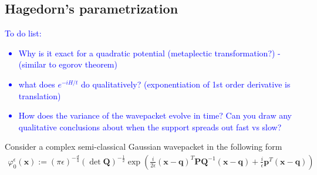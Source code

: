 \usepackage{amsmath}
\usepackage{amssymb}
\newtheorem{theorem}{Theorem}[section]
\newtheorem{lemma}[theorem]{Lemma}
\theoremstyle{definition}
\let\proof\relax\let\endproof\relax %
\usepackage{amsthm,xpatch}
\xpatchcmd{\proof}{\itshape}{\bfseries}{}{}
\renewcommand\qedsymbol{$\blacksquare$}
\usepackage{comment}
\usepackage[
backend=biber,
style=alphabetic,
sorting=ynt
]{biblatex}




\subsection{Hagedorn's parametrization}
\textcolor{blue}{To do list:
\begin{itemize}
  \item Why is it exact for a quadratic potential (metaplectic transformation?) - (similar to egorov theorem)  
  \item what does $e^{-iH/t}$ do qualitatively? (exponentiation of 1st order derivative is translation)
  \item How does the variance of the wavepacket evolve in time? Can you draw 
    any qualitative conclusions about when the support spreads out fast vs slow?
\end{itemize}
}
Consider a complex semi-classical Gaussian wavepacket in the following form
  \begin{align}
    \varphi^\epsilon_0(\bm{x}):=
    (\pi\epsilon)^{-\frac{d}{4}} (\det
    \bm{Q})^{-\frac{1}{2}}
    \exp{\left( \frac{i}{2\epsilon}(\bm{x}-\bm{q})^T\bm{PQ}^{-1}(\bm{x}-\bm{q}) +
    \frac{i}{\epsilon}\bm{p}^T(\bm{x}-\bm{q})\right)}
    \label{hagedorn:hagedorn_wavepackets:complex_gaussian}
  \end{align}
